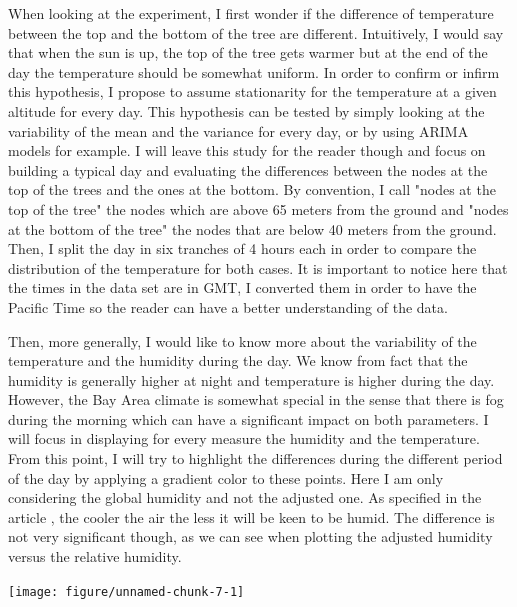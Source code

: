 \documentclass[11pt]{article}\usepackage[]{graphicx}\usepackage[]{color}
\newenvironment{knitrout}{}{} %
\begin{document}
When looking at the experiment, I first wonder if the difference of temperature between the top and the bottom of the tree are different. Intuitively, I would say that when the sun is up, the top of the tree gets warmer but at the end of the day the temperature should be somewhat uniform. In order to confirm or infirm this hypothesis, I propose to assume stationarity for the temperature at a given altitude for every day. This hypothesis can be tested by simply looking at the variability of the mean and the variance for every day, or by using ARIMA models for example. I will leave this study for the reader though and focus on building a typical day and evaluating the differences between the nodes at the top of the trees and the ones at the bottom. By convention, I call "nodes at the top of the tree" the nodes which are above 65 meters from the ground and "nodes at the bottom of the tree" the nodes that are below 40 meters from the ground. Then, I split the day in six tranches of 4 hours each in order to compare the distribution of the temperature for both cases. It is important to notice here that the times in the data set are in GMT, I converted them in order to have the Pacific Time so the reader can have a better understanding of the data.

Then, more generally, I would like to know more about the variability of the temperature and the humidity during the day. We know from fact that the humidity is generally higher at night and temperature is higher during the day. However, the Bay Area climate is somewhat special in the sense that there is fog during the morning which can have a significant impact on both parameters. I will focus in displaying for every measure the humidity and the temperature. From this point, I will try to highlight the differences during the different period of the day by applying a gradient color to these points. Here I am only considering the global humidity and not the adjusted one. As specified in the article \cite{tolle2005macroscope}, the cooler the air the less it will be keen to be humid. The difference is not very significant though, as we can see when plotting the adjusted humidity versus the relative humidity.

\begin{knitrout}
\color{fgcolor}

{\centering \texttt{[image: figure/unnamed-chunk-7-1]} 

}



\end{knitrout}
\end{document}
